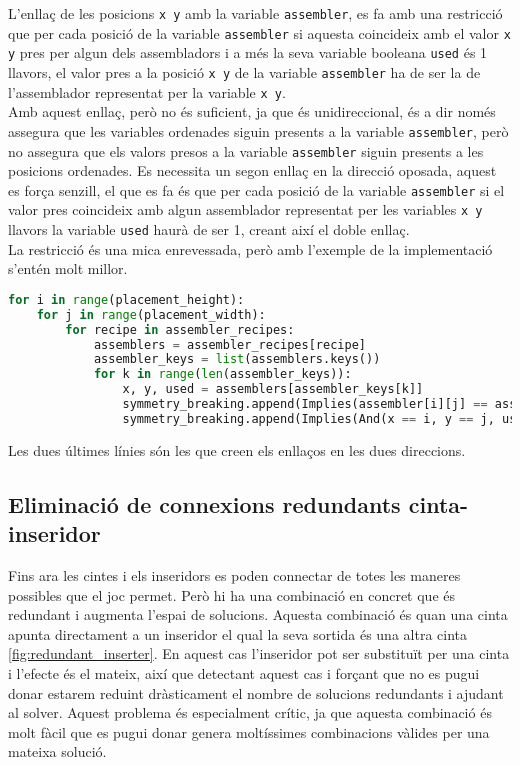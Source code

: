 L'enllaç de les posicions \lstinline{x y} amb la variable \lstinline{assembler}, es fa amb una restricció que per cada posició de la variable \lstinline{assembler} si aquesta coincideix amb el valor \lstinline{x y} pres per algun dels assembladors i a més la seva variable booleana \lstinline{used} és 1 llavors, el valor pres a la posició \lstinline{x y} de la variable \lstinline{assembler} ha de ser la de l'assemblador representat per la variable \lstinline{x y}.\\
Amb aquest enllaç, però no és suficient, ja que és unidireccional, és a dir només assegura que les variables ordenades siguin presents a la variable \lstinline{assembler}, però no assegura que els valors presos a la variable \lstinline{assembler} siguin presents a les posicions ordenades. Es necessita un segon enllaç en la direcció oposada, aquest es força senzill, el que es fa és que per cada posició de la variable \lstinline{assembler} si el valor pres coincideix amb algun assemblador representat per les variables \lstinline{x y} llavors la variable \lstinline{used} haurà de ser 1, creant així el doble enllaç.\\
La restricció és una mica enrevessada, però amb l'exemple de la implementació s'entén molt millor.

\begin{lstlisting}[language=Python, caption=Enllaç entre variables]
for i in range(placement_height):
    for j in range(placement_width):
        for recipe in assembler_recipes:
            assemblers = assembler_recipes[recipe]
            assembler_keys = list(assemblers.keys())
            for k in range(len(assembler_keys)):
                x, y, used = assemblers[assembler_keys[k]]
                symmetry_breaking.append(Implies(assembler[i][j] == assembler_keys[k], used == 1))
                symmetry_breaking.append(Implies(And(x == i, y == j, used == 1), assembler[i][j] == assembler_keys[k]))
\end{lstlisting}

Les dues últimes línies són les que creen els enllaços en les dues direccions.


\subsection{Eliminació de connexions redundants cinta-inseridor}\label{prevent-redundant-inserters}
Fins ara les cintes i els inseridors es poden connectar de totes les maneres possibles que el joc permet. Però hi ha una combinació en concret que és redundant i augmenta l'espai de solucions. Aquesta combinació és quan una cinta apunta directament a un inseridor el qual la seva sortida és una altra cinta \ref{fig:redundant_inserter}. En aquest cas l'inseridor pot ser substituït per una cinta i l'efecte és el mateix, així que detectant aquest cas i forçant que no es pugui donar estarem reduint dràsticament el nombre de solucions redundants i ajudant al solver. Aquest problema és especialment crític, ja que aquesta combinació és molt fàcil que es pugui donar genera moltíssimes combinacions vàlides per una mateixa solució.

